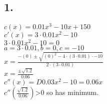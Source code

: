 \documentclass{article}
\begin{document}
  \subsection{1.}
  $c(x)=0.01x^3-10x+150$\\
  $c'(x)=3\cdot0.01x^2-10$\\
  $3\cdot0.01x^2-10=0$\\
  $a=3\cdot0.01,b=0,c=-10$\\
  $x=\frac{-(0)\pm\sqrt{(0)^2-4\cdot(3\cdot0.01)\cdot-10}}{2\cdot(3\cdot0.01)}$\\
  $x=\frac{\pm\sqrt{1.2}}{0.06}$\\
  $c''(x)=D 0.03x^2-10=0.06x$\\
  $c''(\frac{\sqrt{1.2}}{0.06})$>0 so has minimum.\\
   

   
\end{document}
